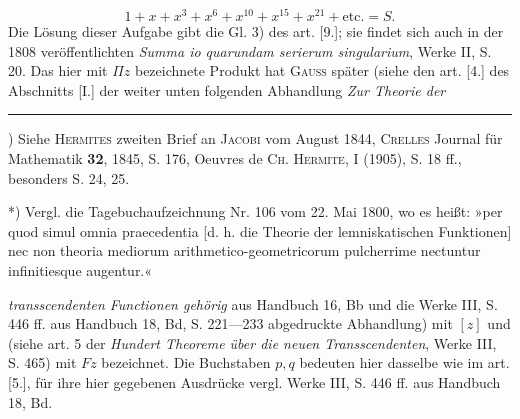 \par{}\par
\[1+x+x^3+x^6+x^{10}+x^{15}+x^{21}+\text{etc.}=S.\]
\noindent Die Lösung dieser Aufgabe gibt die Gl. 3) des art. [9.]; sie findet sich auch in der 1808 veröffentlichten \textit{Summa io quarundam serierum singularium}, Werke II, S. 20. Das hier mit $\Pi z$ bezeichnete Produkt hat \textsc{Gauss} später (siehe den art. [4.] des Abschnitts [I.] der weiter unten folgenden Abhandlung \textit{Zur Theorie der}
\par\smallskip\noindent\rule{.25\linewidth}{.4pt}\par
{\small
\par\indent *) Siehe \textsc{Hermites} zweiten Brief an \textsc{Jacobi} vom August 1844, \textsc{Crelles} Journal für Mathematik \textbf{32}, 1845, S. 176, Oeuvres de \textsc{Ch. Hermite}, I (1905), S. 18 ff., besonders S. 24, 25.
\par\indent **) Vergl. die Tagebuchaufzeichnung Nr. 106 vom 22. Mai 1800, wo es heißt: »per quod simul omnia praecedentia [d. h. die Theorie der lemniskatischen Funktionen] nec non theoria mediorum arithmetico-geometricorum pulcherrime nectuntur infinitiesque augentur.«
\par}
\clearpage
{}
\noindent\textit{transscendenten Functionen gehörig} aus Handbuch 16, Bb und die Werke III, S. 446 ff. aus Handbuch 18, Bd, S. 221—233 abgedruckte Abhandlung) mit $[z]$ und (siehe art. 5 der \textit{Hundert Theoreme über die neuen Transscendenten}, Werke III, S. 465) mit $Fz$ bezeichnet. Die Buchstaben $p,q$ bedeuten hier dasselbe wie im art. [5.], für ihre hier gegebenen Ausdrücke vergl. Werke III, S. 446 ff. aus Handbuch 18, Bd.
